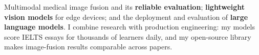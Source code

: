 
\vspace{4pt}

\begin{cvparagraph}
Multimodal medical image fusion and its \textbf{reliable evaluation}; \textbf{lightweight vision models} for edge devices; and the deployment and evaluation of \textbf{large language models}. I combine research with production engineering: my models score IELTS essays for thousands of learners daily, and my open-source library makes image-fusion results comparable across papers.
\end{cvparagraph}

\vspace{4pt}
